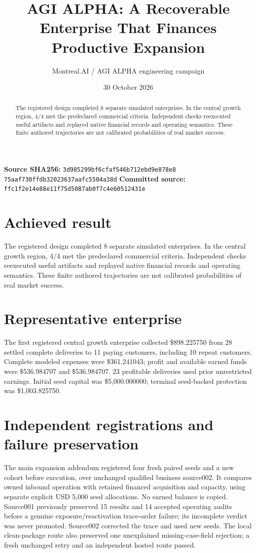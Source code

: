 \documentclass[10pt,letterpaper]{article}
\title{AGI ALPHA: A Recoverable Enterprise That Finances Productive Expansion}
\author{Montreal.AI / AGI ALPHA engineering campaign}
\date{30 October 2026}
\begin{document}
\maketitle
\begin{abstract}The registered design completed 8 separate simulated enterprises. In the central growth region, 4/4 met the predeclared commercial criteria. Independent checks reexecuted useful artifacts and replayed native financial records and operating semantics. These finite authored trajectories are not calibrated probabilities of real market success.\end{abstract}
\textbf{Source SHA256:} \texttt{3d985299bf6cfaf546b712ebd9e878e8}\\\texttt{75aaf730ffdb32023637aafc5504a38d}
\textbf{Committed source:} \texttt{ffc1f2e14e88e11f75d5087ab0f7c4e60512431e}
\section{Achieved result}
The registered design completed 8 separate simulated enterprises. In the central growth region, 4/4 met the predeclared commercial criteria. Independent checks reexecuted useful artifacts and replayed native financial records and operating semantics. These finite authored trajectories are not calibrated probabilities of real market success.
\section{Representative enterprise}
The first registered central growth enterprise collected \$898.225750 from 28 settled complete deliveries to 11 paying customers, including 10 repeat customers. Complete modeled expenses were \$361.241043; profit and available earned funds were \$536.984707 and \$536.984707. 23 profitable deliveries used prior unrestricted earnings. Initial seed capital was \$5,000.000000; terminal seed-backed protection was \$1,003.825750.
\section{Independent registrations and failure preservation}
The main expansion addendum registered four fresh paired seeds and a new cohort before execution, over unchanged qualified business source002. It compares owned inbound operation with retained financed acquisition and capacity, using separate explicit USD 5,000 seed allocations. No earned balance is copied. Source001 previously preserved 15 results and 14 accepted operating audits before a genuine exposure/reactivation trace-order failure; its incomplete verdict was never promoted. Source002 corrected the trace and used new seeds. The local clean-package route also preserved one unexplained missing-case-field rejection; a fresh unchanged retry and an independent hosted route passed.
\end{document}
